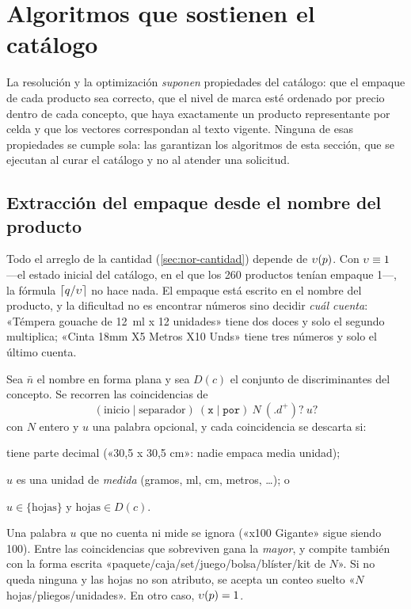 \section{Algoritmos que sostienen el catálogo}
\label{sec:catalogo}

La resolución y la optimización \emph{suponen} propiedades del catálogo:
que el empaque de cada producto sea correcto, que el nivel de marca esté
ordenado por precio dentro de cada concepto, que haya exactamente un producto
representante por celda y que los vectores correspondan al texto vigente.
Ninguna de esas propiedades se cumple sola: las garantizan los algoritmos de
esta sección, que se ejecutan al curar el catálogo y no al atender una
solicitud.

\subsection{Extracción del empaque desde el nombre del producto}
\label{sec:cat-empaque}

Todo el arreglo de la cantidad (\cref{sec:nor-cantidad}) depende de
$\upsilon(p)$. Con $\upsilon\equiv1$ ---el estado inicial del catálogo, en el que los
260 productos tenían empaque 1---, la fórmula $\left\lceil q/\upsilon \right\rceil$ no hace nada.
El empaque está escrito en el nombre del producto, y la dificultad no es
encontrar números sino decidir \emph{cuál cuenta}: «Témpera gouache de 12~ml
x 12 unidades» tiene dos doces y solo el segundo multiplica; «Cinta 18mm X5
Metros X10 Unds» tiene tres números y solo el último cuenta.

\begin{definicion}
\label{def:regla-empaque}
Sea $\bar n$ el nombre en forma plana y sea $D(c)$ el conjunto de
discriminantes del concepto. Se recorren las coincidencias de
\[
  (\text{inicio}\mid\text{separador})\ (\texttt{x}\mid\texttt{por})\ N\ (\texttt{.}d^+)?\ u?
\]
con $N$ entero y $u$ una palabra opcional, y cada coincidencia se descarta si:
\begin{enumerate*}[label=(\roman*)]
  \item tiene parte decimal («30,5 x 30,5 cm»: nadie empaca media unidad);
  \item $u$ es una unidad de \emph{medida} (gramos, ml, cm, metros, \dots); o
  \item $u\in\{\text{hojas}\}$ y $\text{hojas}\in D(c)$.
\end{enumerate*}
Una palabra $u$ que no cuenta ni mide se ignora («x100 Gigante» sigue siendo
100). Entre las coincidencias que sobreviven gana la \emph{mayor}, y compite
también con la forma escrita «paquete/caja/set/juego/bolsa/blíster/kit de
$N$». Si no queda ninguna y las hojas no son atributo, se acepta un conteo
suelto «$N$ hojas/pliegos/unidades». En otro caso, $\upsilon(p)=1$.
\end{definicion}


